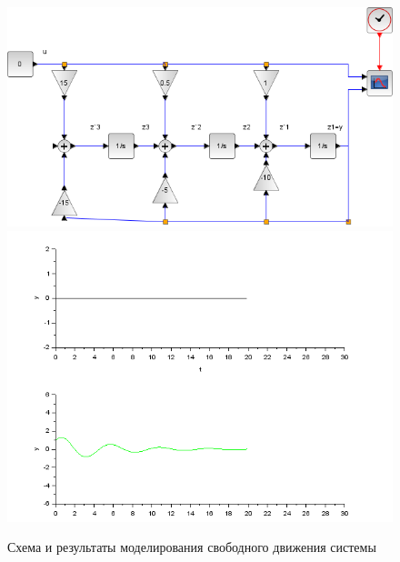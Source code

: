 \documentclass[a4paper,12pt,russian]{article} %
\begin{document}
\begin{figure}[H]
	\includegraphics[width=1\textwidth]{вход-выход-схема-св}
	\includegraphics[width=1\textwidth]{вход-выход-св}
	\caption{Схема и результаты моделирования свободного движения системы}
\end{figure}
\end{document}
